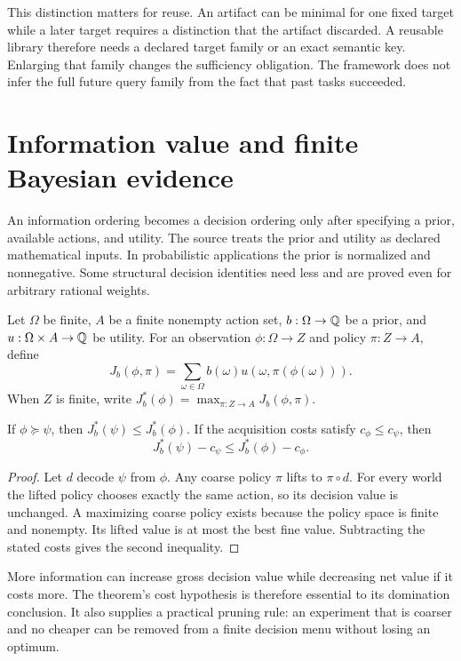 This distinction matters for reuse. An artifact can be minimal for one fixed target while a later target requires a distinction that the artifact discarded. A reusable library therefore needs a declared target family or an exact semantic key. Enlarging that family changes the sufficiency obligation. The framework does not infer the full future query family from the fact that past tasks succeeded.

\section{Information value and finite Bayesian evidence}
\label{sec:information-value}

An information ordering becomes a decision ordering only after specifying a prior, available actions, and utility. The source treats the prior and utility as declared mathematical inputs. In probabilistic applications the prior is normalized and nonnegative. Some structural decision identities need less and are proved even for arbitrary rational weights.

\begin{definition}
Let $\Omega$ be finite, $A$ be a finite nonempty action set, $b:\Omega\to\mathbb Q$ be a prior, and $u:\Omega\times A\to\mathbb Q$ be utility. For an observation $\phi:\Omega\to Z$ and policy $\pi:Z\to A$, define
\[
 J_b(\phi,\pi)=\sum_{\omega\in\Omega}b(\omega)u(\omega,\pi(\phi(\omega))).
\]
When $Z$ is finite, write $J_b^*(\phi)=\max_{\pi:Z\to A}J_b(\phi,\pi)$.
\end{definition}

\begin{theorem}
If $\phi\succeq\psi$, then $J_b^*(\psi)\le J_b^*(\phi)$. If the acquisition costs satisfy $c_\phi\le c_\psi$, then
\[
 J_b^*(\psi)-c_\psi\le J_b^*(\phi)-c_\phi.
\]
\end{theorem}
\begin{proof}
Let $d$ decode $\psi$ from $\phi$. Any coarse policy $\pi$ lifts to $\pi\circ d$. For every world the lifted policy chooses exactly the same action, so its decision value is unchanged. A maximizing coarse policy exists because the policy space is finite and nonempty. Its lifted value is at most the best fine value. Subtracting the stated costs gives the second inequality.
\end{proof}

More information can increase gross decision value while decreasing net value if it costs more. The theorem's cost hypothesis is therefore essential to its domination conclusion. It also supplies a practical pruning rule: an experiment that is coarser and no cheaper can be removed from a finite decision menu without losing an optimum.

